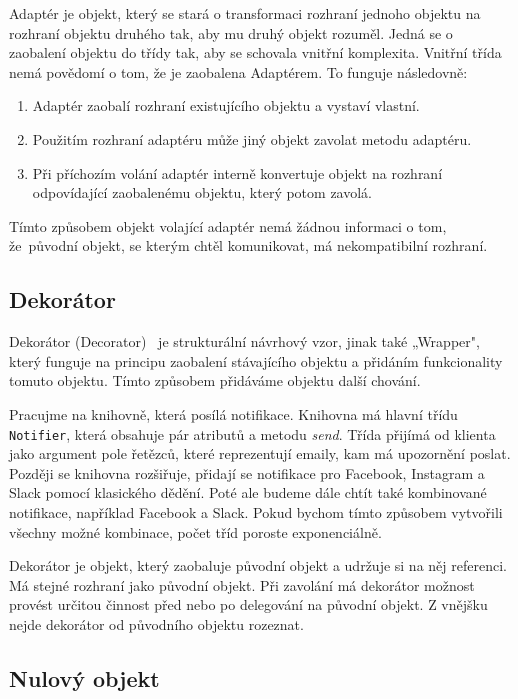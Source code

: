 Adaptér je objekt, který se stará o transformaci rozhraní jednoho objektu na rozhraní objektu druhého tak, aby mu druhý objekt rozuměl. Jedná se o zaobalení objektu do třídy tak, aby se schovala vnitřní komplexita. Vnitřní třída nemá povědomí o tom, že je zaobalena Adaptérem. To funguje následovně:

\begin{enumerate}
    \item Adaptér zaobalí rozhraní existujícího objektu a vystaví vlastní.
    \item Použitím rozhraní adaptéru může jiný objekt zavolat metodu adaptéru.
    \item Při příchozím volání adaptér interně konvertuje objekt na rozhraní odpovídající zaobalenému objektu, který potom zavolá.
\end{enumerate}

Tímto způsobem objekt volající adaptér nemá žádnou informaci o tom, že~původní objekt, se kterým chtěl komunikovat, má nekompatibilní rozhraní.

\subsection{Dekorátor}

Dekorátor (Decorator)~\cite{Decorator} je strukturální návrhový vzor, jinak také „Wrapper", který funguje na principu zaobalení stávajícího objektu a přidáním funkcionality tomuto objektu. Tímto způsobem přidáváme objektu další chování.

Pracujme na knihovně, která posílá notifikace. Knihovna má hlavní třídu \texttt{Notifier}, která obsahuje pár atributů a metodu \textit{send}. Třída přijímá od klienta jako argument pole řetězců, které reprezentují emaily, kam má upozornění poslat. Později se knihovna rozšiřuje, přidají se notifikace pro Facebook, Instagram a Slack pomocí klasického dědění. Poté ale budeme dále chtít také kombinované notifikace, například Facebook a Slack. Pokud bychom tímto způsobem vytvořili všechny možné kombinace, počet tříd poroste exponenciálně.

Dekorátor je objekt, který zaobaluje původní objekt a udržuje si na něj referenci. Má stejné rozhraní jako původní objekt. Při zavolání má dekorátor možnost provést určitou činnost před nebo po delegování na původní objekt. Z vnějšku nejde dekorátor od původního objektu rozeznat.

\subsection{Nulový objekt}
\label{null object}

